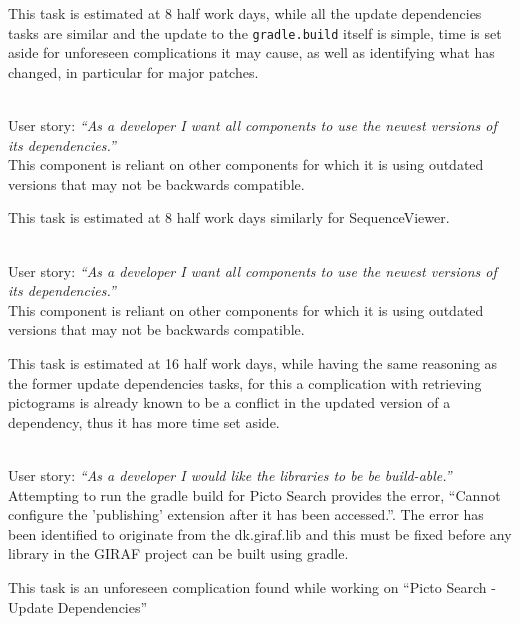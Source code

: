 \begin{description}[style=unboxed]
        This task is estimated at 8 half work days, while all the update dependencies tasks are similar and the update to the \texttt{gradle.build} itself is simple, time is set aside for unforeseen complications it may cause, as well as identifying what has changed, in particular for major patches.
    \item[Sequence - Update dependencies] \hfill \\
        User story: \textit{``As a developer I want all components to use the newest versions of its dependencies.''} \\
        This component is reliant on other components for which it is using outdated versions that may not be backwards compatible.

        This task is estimated at 8 half work days similarly for SequenceViewer.
    \item[Picto Search - Update dependencies] \hfill \\
        User story: \textit{``As a developer I want all components to use the newest versions of its dependencies.''} \\
        This component is reliant on other components for which it is using outdated versions that may not be backwards compatible.

        This task is estimated at 16 half work days, while having the same reasoning as the former update dependencies tasks, for this a complication with retrieving pictograms is already known to be a conflict in the updated version of a dependency, thus it has more time set aside.
    \item[Blocking Task - Custom plugin dk.giraf.lib for gradle breaks build] \hfill \\
        User story: \textit{``As a developer I would like the libraries to be be build-able.''} \\
        Attempting to run the gradle build for Picto Search provides the error, ``Cannot configure the 'publishing' extension after it has been accessed.''. 
        The error has been identified to originate from the dk.giraf.lib and this must be fixed before any library in the GIRAF project can be built using gradle. 

        This task is an unforeseen complication found while working on ``Picto Search - Update Dependencies''
\end{description}

